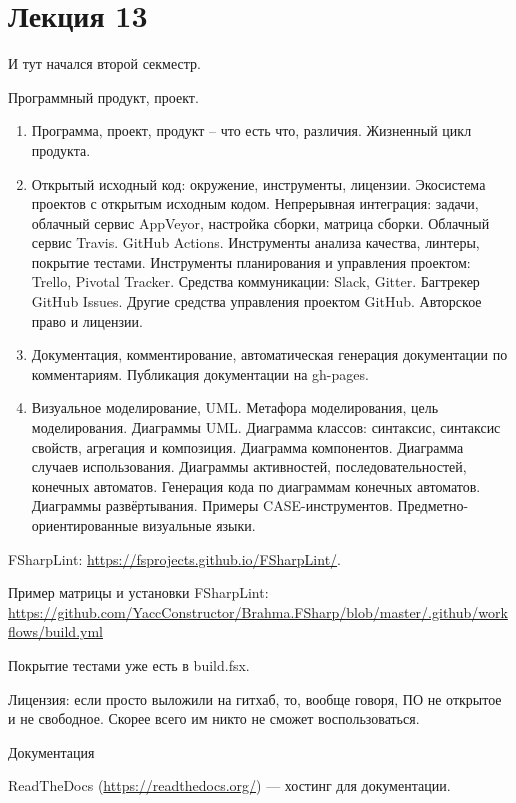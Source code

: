 \section{Лекция 13}
 
И тут начался второй секместр.

Программный продукт, проект.

\begin{enumerate}
    \item Программа, проект, продукт – что есть что, различия. Жизненный цикл продукта.
    \item Открытый исходный код: окружение, инструменты, лицензии. Экосистема проектов с открытым исходным кодом. Непрерывная интеграция: задачи, облачный сервис AppVeyor, настройка сборки, матрица сборки. Облачный сервис Travis. GitHub Actions. Инструменты анализа качества, линтеры, покрытие тестами. Инструменты планирования и управления проектом: Trello, Pivotal Tracker. Средства коммуникации: Slack, Gitter. Багтрекер GitHub Issues. Другие средства управления проектом GitHub. Авторское право и лицензии.
    \item Документация, комментирование, автоматическая генерация документации по комментариям. Публикация документации на gh-pages.
    \item Визуальное моделирование, UML. Метафора моделирования, цель моделирования. Диаграммы UML. Диаграмма классов: синтаксис, синтаксис свойств, агрегация и композиция. Диаграмма компонентов. Диаграмма случаев использования. Диаграммы активностей, последовательностей, конечных автоматов. Генерация кода по диаграммам конечных автоматов. Диаграммы развёртывания. Примеры CASE-инструментов. Предметно-ориентированные визуальные языки.

\end{enumerate}


FSharpLint: \url{https://fsprojects.github.io/FSharpLint/}. 

Пример матрицы и установки FSharpLint: \url{https://github.com/YaccConstructor/Brahma.FSharp/blob/master/.github/workflows/build.yml}

Покрытие тестами уже есть в build.fsx. 

Лицензия: если просто выложили на гитхаб, то, вообще говоря, ПО не открытое и не свободное. Скорее всего им никто не сможет воспользоваться.

Документация

ReadTheDocs (\url{https://readthedocs.org/}) --- хостинг для документации.

